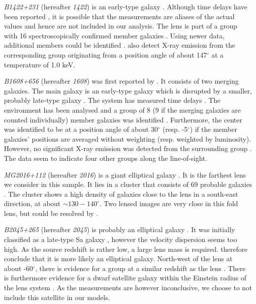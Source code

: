 \documentclass[useAMS,usenatbib]{mn2e}
\begin{document}
\textit{B1422+231} (hereafter \textit{1422}) is an early-type galaxy \citep{1992MNRAS.259P...1P,1994AJ....107...28Y}. Although time delays have been reported \citep{2001MNRAS.326.1403P}, it is possible that the measurements are aliases of the actual values \citep{2003AJ....126...29R} and hence are not included in our analysis. The lens is part of a group with 16 spectroscopically confirmed member galaxies \citep{2006ApJ...641..169M}. Using newer data, additional members could be identified \citep{2011ApJ...726...84W}. \citet{2004ApJ...610..686G} also detect X-ray emission from the corresponding group originating from a position angle of about 147$^{\circ}$ at a temperature of 1.0 keV.

\textit{B1608+656} (hereafter \textit{1608}) was first reported by \citet{1995ApJ...447L...5M}. It consists of two merging galaxies. The main galaxy is an early-type galaxy which is disrupted by a smaller, probably late-type galaxy \citep{2003ApJ...584..100S}. The system has measured time delays \citep{2002ApJ...581..823F}. The environment has been analysed and a group of 8 (9 if the merging galaxies are counted individually) member galaxies was identified \citep{2006ApJ...642...30F}. Furthermore, the center was identified to be at a position angle of about 30$^{\circ}$ (resp. -5$^{\circ}$) if the member galaxies' positions are averaged without weighting (resp. weighted by luminosity). However, no significant X-ray emission was detected from the surrounding group \citep{2005ApJ...625..633D}. The data seem to indicate four other groups along the line-of-sight.

\textit{MG2016+112} (hereafter \textit{2016}) is a giant elliptical galaxy \citep{1984Sci...223...46L,1986AJ.....91..991S}. It is the farthest lens we consider in this sample. It lies in a cluster that consists of 69 probable galaxies \citep{2003MNRAS.344..337T}. The cluster shows a high density of galaxies close to the lens in a south-east direction, at about $\sim130-140^{\circ}$. Two lensed images are very close in this fold lens, but could be resolved by \citet{2009MNRAS.394..174M}.

\textit{B2045+265} (hereafter \textit{2045}) is probably an elliptical galaxy \citep{2007MNRAS.378..109M}. It was initially classified as a late-type Sa galaxy \citep{1999AJ....117..658F}, however the velocity dispersion seems too high. As the source redshift is rather low, a large lens mass is required. \citet{2007MNRAS.378..109M} therefore conclude that it is more likely an elliptical galaxy. North-west of the lens at about -60$^{\circ}$, there is evidence for a group at a similar redshift as the lens \citep{1999AJ....117..658F}. There is furthermore evidence for a dwarf satellite galaxy within the Einstein radius of the lens system \citep{2007MNRAS.378..109M}. As the measurements are however inconclusive, we choose to not include this satellite in our models.
\end{document}
